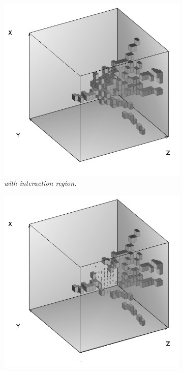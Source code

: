 \begin{figure}[H]
	\centering
	\begin{subfigure}{0.5\textwidth}
		\centering
		\includegraphics[width=.90\linewidth]{ECAL/graphics/before.png}
		\caption{\label{fig:before} \sl with interaction region.}
	\end{subfigure}%
	\begin{subfigure}{0.5\textwidth}
		\centering
		\includegraphics[width=.90\linewidth]{ECAL/graphics/after2.png}

\end{subfigure}
\end{figure}
